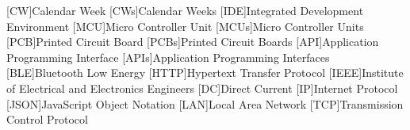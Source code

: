 % 
\begin{acronym}[STATCOM]    %
%
[CW]{Calendar Week}
[CWs]{Calendar Weeks}
%
[IDE]{Integrated Development Environment}
%
[MCU]{Micro Controller Unit}
[MCUs]{Micro Controller Units}
%
[PCB]{Printed Circuit Board}
[PCBs]{Printed Circuit Boards}
%
[API]{Application Programming Interface}
[APIs]{Application Programming Interfaces}
%
[BLE]{Bluetooth Low Energy}
%
[HTTP]{Hypertext Transfer Protocol}
%
[IEEE]{Institute of Electrical and Electronics Engineers}
%
[DC]{Direct Current}
%
[IP]{Internet Protocol}
%
[JSON]{JavaScript Object Notation}
%
[LAN]{Local Area Network}
%
[TCP]{Transmission Control Protocol}
%
\end{acronym}
%